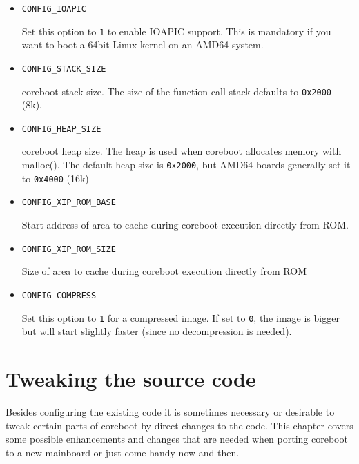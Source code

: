 \documentclass[titlepage,12pt]{article}
\begin{document}
\begin{itemize}
\item \begin{verbatim}CONFIG_IOAPIC\end{verbatim}

Set this option to \texttt{1} to enable IOAPIC support. This is
mandatory if you want to boot a 64bit Linux kernel on an AMD64 system.

\item \begin{verbatim}CONFIG_STACK_SIZE\end{verbatim}

coreboot stack size. The size of the function call stack defaults to
\texttt{0x2000} (8k).

\item \begin{verbatim}CONFIG_HEAP_SIZE\end{verbatim}

coreboot heap size. The heap is used when coreboot allocates memory
with malloc(). The default heap size is \texttt{0x2000}, but AMD64 boards
generally set it to \texttt{0x4000} (16k)

\item \begin{verbatim}CONFIG_XIP_ROM_BASE\end{verbatim}

Start address of area to cache during coreboot execution directly from
ROM.

\item \begin{verbatim}CONFIG_XIP_ROM_SIZE\end{verbatim}

Size of area to cache during coreboot execution directly from ROM

\item \begin{verbatim}CONFIG_COMPRESS\end{verbatim}

Set this option to \texttt{1} for a compressed image. If set to
\texttt{0}, the image is bigger but will start slightly faster (since no
decompression is needed).

\end{itemize}


\newpage

%
% 

\section{Tweaking the source code}
Besides configuring the existing code it is sometimes necessary or
desirable to tweak certain parts of coreboot by direct changes to the
code. This chapter covers some possible enhancements and changes that
are needed when porting coreboot to a new mainboard or just come
handy now and then.
\end{document}
